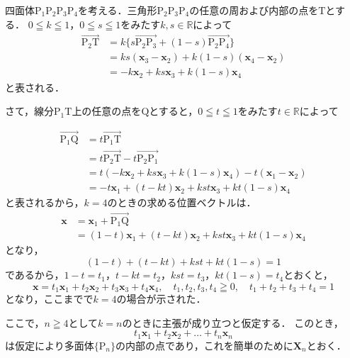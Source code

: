 \begin{tproof}
  四面体$\mathrm{P_1 P_2 P_3 P_4}$を考える．三角形$\mathrm{P_2 P_3 P_4}$の任意の周および内部の点を$\mathrm{T}$とする．
  $0 \leqq k \leqq 1$，$0 \leqq s \leqq 1$をみたす$k,s \in \mathbb{R}$によって
  \begin{align*}
    \overrightarrow{\mathrm{P_2 T}} & = k \{ s \overrightarrow{\mathrm{P_2 P_3}} + (1-s) \overrightarrow{\mathrm{P_2 P_4}} \} \\
                                    & = ks(\bm{x}_3 -\bm{x}_2) + k(1-s) (\bm{x}_4-\bm{x}_2)                                   \\
                                    & = -k\bm{x}_2 + ks \bm{x}_3 + k(1-s) \bm{x}_4
  \end{align*}
  と表される．

  さて，線分$\mathrm{P_1 T}$上の任意の点を$\mathrm{Q}$とすると，$0 \leqq t \leqq 1$をみたす$t \in \mathbb{R}$によって

  \begin{align*}
    \overrightarrow{\mathrm{P_1 Q}} & =t \overrightarrow{\mathrm{P_1 T}}                                      \\
                                    & = t\overrightarrow{\mathrm{P_2 T}} - t\overrightarrow{\mathrm{P_2 P_1}} \\
                                    & = t (-k\bm{x}_2 + ks \bm{x}_3 + k(1-s) \bm{x}_4)-t(\bm{x}_1 -\bm{x}_2)  \\
                                    & = -t\bm{x}_1 +(t-kt) \bm{x}_2 + kst \bm{x}_3 +kt(1-s) \bm{x}_4
  \end{align*}
  と表されるから，$k=4$のときの求める位置ベクトルは．
  \begin{align*}
    \bm{x} & = \bm{x}_1 + \overrightarrow{\mathrm{P_1 Q}}                     \\
           & = (1-t) \bm{x}_1 +(t-kt)\bm{x}_2 +kst \bm{x}_3 +kt(1-s) \bm{x}_4
  \end{align*}
  となり，
  \[
    (1-t)+ (t-kt)+kst + kt(1-s)=1
  \]
  であるから，$1-t = t_1$，$t-kt =t_2$，$kst = t_3$，$kt(1-s)=t_4$とおくと，
  \[
    \bm{x}= t_1 \bm{x}_1 + t_2 \bm{x}_2 + t_3 \bm{x}_3 + t_4 \bm{x}_4 , \quad t_1, t_2 ,t_3 , t_4 \geqq 0 ,\quad  t_1 +t_2 + t_3 + t_4 =1
  \]
  となり，ここまでで$k=4$の場合が示された．

  ここで，$n \geqq 4$として$k=n$のときに主張が成り立つと仮定する．
  このとき，
  \[
    t_1 \bm{x}_1 + t_2 \bm{x}_2+\dots+ t_n \bm{x}_n
  \]
  は仮定により多面体$\{ \mathrm{P}_n \}$の内部の点であり，これを簡単のために$\bm{X}_n$とおく．


\end{tproof}
